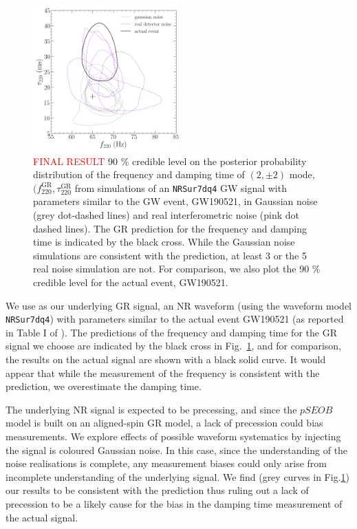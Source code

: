 \documentclass[twocolumn,prd,superscriptaddress,amsfonts,amssymb,amsmath,preprintnumbers]{revtex4-1}
\newcommand{\fgr}[1]{f ^{\text{GR}}_{\text{#1}}}
\newcommand{\taugr}[1]{\tau ^{\text{GR}}_{\text{#1}}}
\begin{document}
\begin{figure}
\begin{center}
	\includegraphics[width=0.5\textwidth]{figures/S190521g_swinjs.png}
	\caption{\textcolor{red}{FINAL RESULT} 90 \% credible level on the posterior probability distribution of the frequency and damping time of $(2,\pm 2)$ mode, $(\fgr{220}, \taugr{220}$ from simulations of an \texttt{NRSur7dq4} GW signal with parameters similar to the GW event, GW190521, in Gaussian noise (grey dot-dashed lines) and real interferometric noise (pink dot dashed lines). The GR prediction for the frequency and damping time is indicated by the black cross. While the Gaussian noise simulations are consistent with the prediction, at least 3 or the 5 real noise simulation are not. For comparison, we also plot the 90 \% credible level for the actual event, GW190521.}
	\label{fig:21g_systematics}
\end{center}	
\end{figure}

We use as our underlying GR signal, an NR waveform (using the waveform model \texttt{NRSur7dq4}) with parameters similar to the actual event GW190521 (as reported in Table I of \cite{Abbott:2020tfl}). The predictions of the frequency and damping time for the GR signal we choose are indicated by the black cross in Fig.~\ref{fig:21g_systematics}, and for comparison, the results on the actual signal are shown with a black solid curve. It would appear that while the measurement of the frequency is consistent with the prediction, we overestimate the damping time. 

The underlying NR signal is expected to be precessing, and since the $pSEOB$ model is built on an aligned-spin GR model, a lack of precession could bias measurements. We explore effects of possible waveform systematics by injecting the signal is coloured Gaussian noise. In this case, since the understanding of the noise realisations is complete, any measurement biases could only arise from incomplete understanding of the underlying signal. We find (grey curves in Fig.\ref{fig:21g_systematics}) our results to be consistent with the prediction thus ruling out a lack of precession to be a likely cause for the bias in the damping time measurement of the actual signal.
\end{document}
